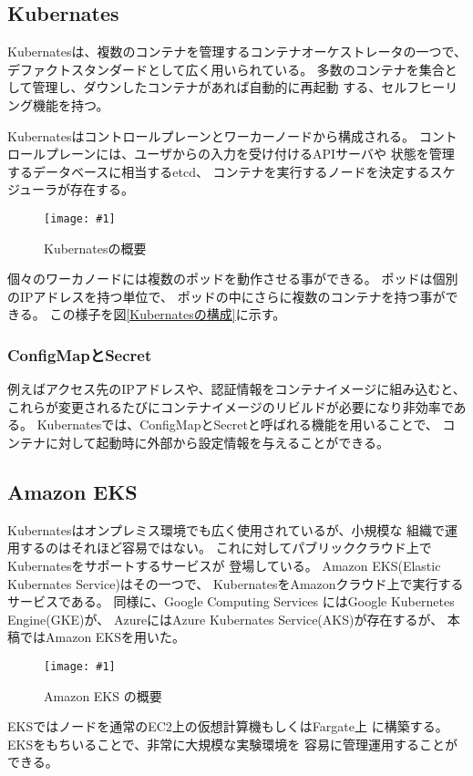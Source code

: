 \documentclass[submit,techrep]{ipsj}
\newcommand{\reffig}[1]{図\ref{#1}}
\newcommand{\epsfig}[4]{
\begin{figure}[tb]
  \begin{center}
    \texttt{[image: \#1]}
  \end{center}
  \caption{#3}
  \label{#4}
\end{figure}}
\newcommand{\kbs}{Kubernates}
\begin{document}
\subsection{Kubernates}

\kbs\cite{k8s}は、複数のコンテナを管理するコンテナオーケストレータの一つで、
デファクトスタンダードとして広く用いられている。
多数のコンテナを集合として管理し、ダウンしたコンテナがあれば自動的に再起動
する、セルフヒーリング機能を持つ。

\kbs はコントロールプレーンとワーカーノードから構成される。
コントロールプレーンには、ユーザからの入力を受け付けるAPIサーバや
状態を管理するデータベースに相当するetcd、
コンテナを実行するノードを決定するスケジューラが存在する。

\epsfig{figs/kubernetes.pdf}{width=8.5cm}{\kbs の概要}{kubernetes}

個々のワーカノードには複数のポッドを動作させる事ができる。
ポッドは個別のIPアドレスを持つ単位で、
ポッドの中にさらに複数のコンテナを持つ事ができる。
この様子を\reffig{\kbs の構成}に示す。

\subsubsection{ConfigMapとSecret}

例えばアクセス先のIPアドレスや、認証情報をコンテナイメージに組み込むと、
これらが変更されるたびにコンテナイメージのリビルドが必要になり非効率である。
\kbs では、ConfigMapとSecretと呼ばれる機能を用いることで、
コンテナに対して起動時に外部から設定情報を与えることができる。


\subsection{Amazon EKS}
\kbs はオンプレミス環境でも広く使用されているが、小規模な
組織で運用するのはそれほど容易ではない。
これに対してパブリッククラウド上で\kbs をサポートするサービスが
登場している。
%
Amazon EKS(Elastic Kubernates Service)\cite{EKS}はその一つで、
KubernatesをAmazonクラウド上で実行するサービスである。
同様に、Google Computing Services にはGoogle Kubernetes Engine(GKE)\cite{gks}が、
AzureにはAzure Kubernates Service(AKS)\cite{aks}が存在するが、
本稿ではAmazon EKSを用いた。

\epsfig{figs/eks.pdf}{width=8.5cm}{Amazon EKS の概要}{eks}

EKSではノードを通常のEC2上の仮想計算機もしくはFargate\cite{fargate}上
に構築する。EKSをもちいることで、非常に大規模な実験環境を
容易に管理運用することができる。
\end{document}

